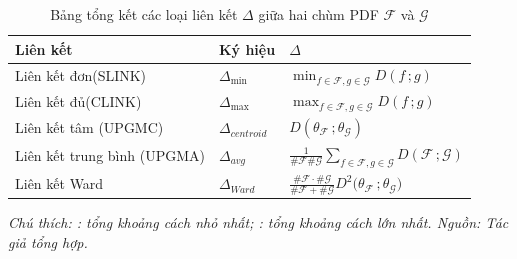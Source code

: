 \documentclass[a4paper,oneside]{book} %
\theoremstyle{plain}
\theoremstyle{plain}
\theoremstyle{nonumberplain}
\begin{document}
\begin{table}[H]
\caption{Bảng tổng kết các loại liên kết $\Delta$ giữa hai chùm PDF $\mathcal{F}$ và $\mathcal{G}$}\label{tab:LINKAGE}
	\centering\fontsize{11pt}{14pt}\selectfont
	\begin{tabular*}{\columnwidth}{@{\extracolsep\fill}lll@{\extracolsep\fill}} 
			\toprule
			\bf Liên kết &\bf Ký hiệu & \bf                             $\Delta$                             \\ \midrule
			Liên kết đơn\footnotemark[1] (SLINK)\cite{florek1951liaison}&$\Delta_{\min}$&$\min_{f\in\mathcal{F}, g\in\mathcal{G}}D(f\,;g)$\\
			Liên kết đủ\footnotemark[2] (CLINK)\cite{sorensen1948method} &$\Delta_{\max}$& $\max_{f\in\mathcal{F}, g\in\mathcal{G}}D(f\,;g)$\\
			Liên kết tâm (UPGMC)&$\Delta_{centroid}$&$D(\theta_{\mathcal{F}}\,;\theta_{\mathcal{G}})$\\
			Liên kết trung bình (UPGMA)&$\Delta_{avg}$ & $\frac{1}{\#\mathcal{F}\#\mathcal{G}}\sum_{f\in\mathcal{F}, g\in\mathcal{G}}D(\mathcal{F}\,;\mathcal{G})$\\
			Liên kết Ward \cite{ward1963hierarchical}&$\Delta_{Ward}$ &$\frac{\#\mathcal{F} \cdot \#\mathcal{G}}{\#\mathcal{F} + \#\mathcal{G}} D^2\big(\theta_{\mathcal{F}}\,;\theta_{\mathcal{G}}\big)
			$\\ \bottomrule
		\end{tabular*}
\begin{minipage}{\textwidth}
\fontsize{11pt}{14pt}\selectfont\it
Chú thích: \footnotemark[1]: tổng khoảng cách nhỏ nhất; \footnotemark[2]: tổng khoảng cách lớn nhất. Nguồn: Tác giả tổng hợp.
\end{minipage}
\end{table}


\end{document}
